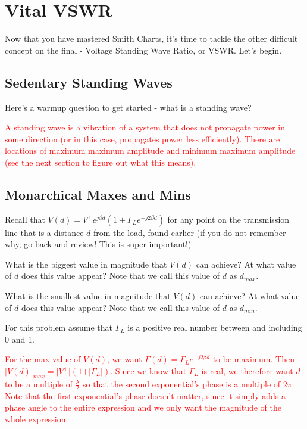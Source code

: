 \documentclass{article}
\begin{document}
\newpage

\section{Vital VSWR}

Now that you have mastered Smith Charts, it's time to tackle the other difficult concept on the final - Voltage Standing Wave Ratio, or VSWR. Let's begin.

\subsection{Sedentary Standing Waves}

Here's a warmup question to get started - what is a standing wave?

\textcolor{red}{A standing wave is a vibration of a system  that does not propagate power in some direction (or in this case, propagates power less efficiently). There are locations of maximum maximum amplitude and minimum maximum amplitude (see the next section to figure out what this means).}

\vfill

\subsection{Monarchical Maxes and Mins}

Recall that $V(d) = V^+ e^{j \beta d} (1 + \Gamma_L e^{-j2\beta d})$ for any point on the transmission line that is a distance $d$ from the load, found earlier (if you do not remember why, go back and review! This is super important!)

What is the biggest value in magnitude that $V(d)$ can achieve? At what value of $d$ does this value appear? Note that we call this value of $d$ as $d_{max}$.

What is the smallest value in magnitude that $V(d)$ can achieve? At what value of $d$ does this value appear? Note that we call this value of $d$ as $d_{min}$.

For this problem assume that $\Gamma_L$ is a positive real number between and including 0 and 1.

\textcolor{red}{For the max value of $V(d)$, we want $\Gamma(d) = \Gamma_L e^{-j2\beta d}$ to be maximum. Then $\vert V(d) \vert_{max} = \vert V^+ \vert (1 + \vert \Gamma_L \vert)$. Since we know that $\Gamma_L$ is real, we therefore want $d$ to be a multiple of $\frac{\lambda}{2}$ so that the second exponential's phase is a multiple of $2 \pi$. Note that the first exponential's phase doesn't matter, since it simply adds a phase angle to the entire expression and we only want the magnitude of the whole expression.}
\end{document}
